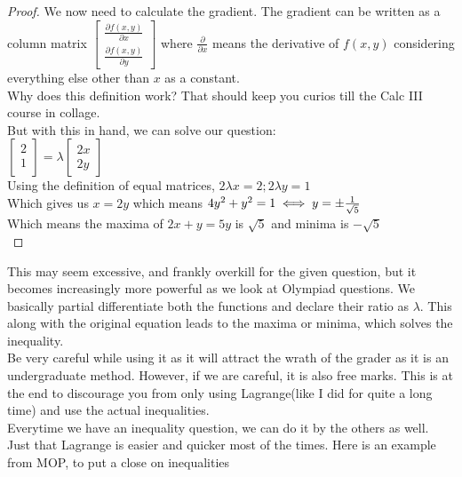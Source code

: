 \begin{proof}
    We now need to calculate the gradient. The gradient can be written as a column matrix $\begin{bmatrix}
        \frac{\partial f(x,y)}{\partial x}\\
        \frac{\partial f(x,y)}{\partial y}
    \end{bmatrix}$ where $\frac{\partial}{\partial x}$ means the derivative of $f(x,y)$ considering everything else other than $x$ as a constant.\\
    Why does this definition work? That should keep you curios till the Calc III course in collage.\\
    But with this in hand, we can solve our question:\\
    $\begin{bmatrix}
        2\\
        1\\
    \end{bmatrix} = \lambda \begin{bmatrix}
        2x\\
        2y
    \end{bmatrix}$\\
    Using the definition of equal matrices, $2 \lambda x=2; 2\lambda y=1$\\
    Which gives us $x=2y$ which means $4y^2+y^2=1\\
    \iff y=\pm \frac{1}{\sqrt{5}}$\\
    Which means the maxima of $2x+y=5y$ is $\sqrt{5}$ and minima is $-\sqrt{5}$\\
\end{proof}
This may seem excessive, and frankly overkill for the given question, but it becomes increasingly more powerful as we look at Olympiad questions. We basically partial differentiate both the functions and declare their ratio as $\lambda$. This along with the original equation leads to the maxima or minima, which solves the inequality.\\
Be very careful while using it as it will attract the wrath of the grader as it is an undergraduate method. However, if we are careful, it is also free marks. This is at the end to discourage you from only using Lagrange(like I did for quite a long time) and use the actual inequalities.\\
Everytime we have an inequality question, we can do it by the others as well. Just that Lagrange is easier and quicker most of the times. Here is an example from MOP, to put a close on inequalities\\
